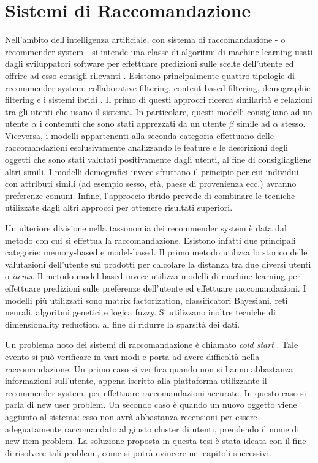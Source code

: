 \documentclass[11pt]{report}
\begin{document}
\section{Sistemi di Raccomandazione}


Nell'ambito dell'intelligenza artificiale, con sistema di raccomandazione - o recommender system - si intende una classe di algoritmi di machine learning usati dagli sviluppatori software per effettuare predizioni sulle scelte dell'utente ed offrire ad esso consigli rilevanti \cite{indatalabs}.  
Esistono principalmente quattro tipologie di recommender system: collaborative filtering, content based filtering, demographic filtering e i sistemi ibridi \cite{re-sys-survey}. Il primo di questi approcci ricerca similarità e relazioni tra gli utenti che usano il sistema. In particolare, questi modelli consigliano ad un utente \emph{$\alpha$} i contenuti che sono stati apprezzati da un utente \emph{$\beta$} simile ad \emph{$\alpha$} stesso. Viceversa, i modelli appartenenti alla seconda categoria effettuano delle raccomandazioni esclusivamente analizzando le feature e le descrizioni degli oggetti che sono stati valutati positivamente dagli utenti, al fine di consigliagliene altri simili. I modelli demografici invece sfruttano il principio per cui individui con attributi simili (ad esempio sesso, età, paese di provenienza ecc.) avranno preferenze comuni. Infine, l'approccio ibrido prevede di combinare le tecniche utilizzate dagli altri approcci per ottenere risultati superiori.

Un ulteriore divisione nella tassonomia dei recommender system è data dal metodo con cui si effettua la raccomandazione. Esistono infatti due principali categorie: memory-based e model-based\cite{re-sys-survey}. Il primo metodo utilizza lo storico delle valutazioni dell'utente sui prodotti per calcolare la distanza tra due diversi utenti o \textit{items}. Il metodo model-based invece utilizza modelli di machine learning per effettuare predizioni sulle preferenze dell'utente ed effettuare raccomandazioni. I modelli più utilizzati sono matrix factorization, classificatori Bayesiani, reti neurali, algoritmi genetici e logica fuzzy. Si utilizzano inoltre tecniche di dimensionality reduction, al fine di ridurre la sparsità dei dati.


Un problema noto dei sistemi di raccomandazione è chiamato \textit{cold start} \cite{re-sys-survey}. Tale evento si può verificare in vari modi e porta ad avere difficoltà nella raccomandazione. Un primo caso si verifica quando non si hanno abbastanza informazioni sull'utente, appena iscritto alla piattaforma utilizzante il recommender system, per effettuare raccomandazioni accurate. In questo caso si parla di new user problem. Un secondo caso è quando un nuovo oggetto viene aggiunto al sistema: esso non avrà abbastanza recensioni per essere adeguatamente raccomandato al giusto cluster di utenti, prendendo il nome di new item problem. La soluzione proposta in questa tesi è stata ideata con il fine di risolvere tali problemi, come si potrà evincere nei capitoli successivi.\\
\end{document}
